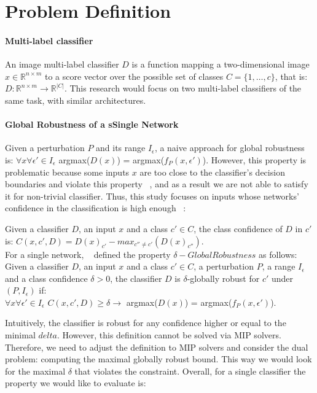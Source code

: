 
\section{Problem Definition}

\sloppy
\paragraph{Multi-label classifier}
An image multi-label classifier $D$ is a function mapping a two-dimensional image $x\in \mathbb{R}^{n \times m}$ to a score vector over the possible set of classes $C=\{1,\ldots,c\}$, that is:
$D: \mathbb{R}^{n \times m} \rightarrow {\mathbb{R}}^{|C|}$.
This research would focus on two multi-label classifiers of the same task, with similar architectures.


\paragraph{Global Robustness of a sSingle Network}
Given a perturbation $P$ and its range $I_\epsilon$, a naive approach for global robustness is:
$\forall{x}\forall{\epsilon'}\in{I_\epsilon}$  argmax($D(x)$) = argmax($f_P(x,\epsilon')$).
However, this property is problematic because some inputs $x$ are too close to the classifier's decision boundaries and violate this property ~\cite{DECISIONBOUND}, and as a result we are not able to satisfy it for non-trivial classifier. Thus, this study focuses on inputs whose networks' confidence in the classification is high enough ~\cite{VHAGAR}:

Given a classifier $D$, an input $x$ and a class $c'\in{C}$, the class confidence of $D$ in $c'$ is:
$C(x,c',D)=D(x)_{c'}-max_{c''\ne c'}(D(x)_{c''})$.\\
For a single network, ~\cite{VHAGAR} defined the property $\delta-Global Robustness$ as follows:\\
Given a classifier $D$, an input $x$ and a class $c'\in{C}$, a perturbation $P$, a range $I_\epsilon$ and a class confidence $\delta>0$, the classifier $D$ is $\delta$-globally robust for $c'$ under $(P,I_\epsilon)$ if:\\
$\forall{x}\forall{\epsilon'}\in{I_\epsilon}$ $C(x,c',D) \geq \delta \rightarrow$ argmax($D(x)$) = argmax($f_P(x,\epsilon')$).

Intuitively, the classifier is robust for any confidence higher or equal to the minimal $delta$. However, this definition cannot be solved via MIP solvers. Therefore, we need to adjust the definition to MIP solvers and consider the dual problem: computing the maximal globally robust bound. This way we would look for the maximal $\delta$ that violates the constraint. Overall, for a single classifier the property we would like to evaluate is:

